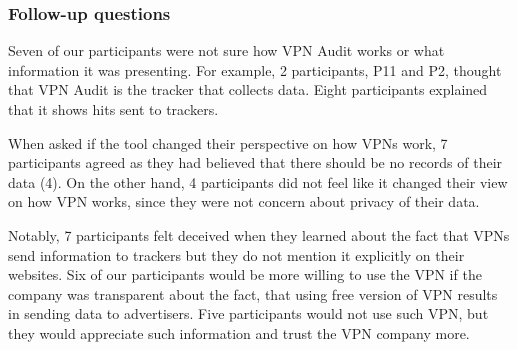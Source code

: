 \subsubsection{Follow-up questions} 

Seven of our participants were not sure how VPN Audit works or what
information it was presenting. For example, 2 participants, P11 and P2,
thought that VPN Audit is the tracker that collects data. Eight participants
explained that it shows hits sent to trackers. 

When asked if the tool changed their perspective on how VPNs work, 7
participants agreed as they had believed that there should be no records of
their data (4). On the other hand, 4 participants did not feel like it changed
their view on how VPN works, since they were not concern about privacy of
their data.

Notably, 7 participants felt deceived when they learned about the fact that
VPNs send information to trackers but they do not mention it explicitly on
their websites. Six of our participants would be more willing to use the VPN
if the company was transparent about the fact, that using free version of VPN
results in sending data to advertisers. Five participants would not use such
VPN, but they would appreciate such information and trust the VPN company
more. 


